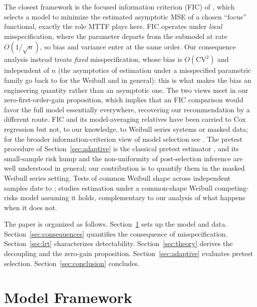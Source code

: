 \documentclass[11pt]{article}
\newcommand{\CV}{\mathrm{CV}}
\begin{document}
The closest framework is the focused information criterion (FIC) of \citet{claeskens2003fic, hjort2003fma}, which selects a model to minimize the estimated asymptotic MSE of a chosen ``focus'' functional, exactly the role MTTF plays here. FIC operates under \emph{local} misspecification, where the parameter departs from the submodel at rate $O(1/\sqrt{n})$, so bias and variance enter at the same order. Our consequence analysis instead treats \emph{fixed} misspecification, whose bias is $O(\CV^2)$ and independent of $n$ (the asymptotics of estimation under a misspecified parametric family go back to \citet{pascual2005} for the Weibull and \citet{White-1982} in general); this is what makes the bias an engineering quantity rather than an asymptotic one. The two views meet in our zero-first-order-gain proposition, which implies that an FIC comparison would favor the full model essentially everywhere, recovering our recommendation by a different route. FIC and its model-averaging relatives \citep{claeskens2008book} have been carried to Cox regression \citep{claeskens2006cox} but not, to our knowledge, to Weibull series systems or masked data; for the broader information-criterion view of model selection see \citet{burnham2002}. The pretest procedure of Section~\ref{sec:adaptive} is the classical pretest estimator \citep{bancroft1944, judge1978, giles1993, danilov2004}, and its small-sample risk hump and the non-uniformity of post-selection inference \citep{leeb2005} are well understood in general; our contribution is to quantify them in the masked Weibull series setting. Tests of common Weibull shape across independent samples date to \citet{mccool1975, mccool1979}; \citet{hart2024} studies estimation under a common-shape Weibull competing-risks model assuming it holds, complementary to our analysis of what happens when it does not.

The paper is organized as follows. Section~\ref{sec:framework} sets up the model and data. Section~\ref{sec:consequences} quantifies the consequence of misspecification. Section~\ref{sec:lrt} characterizes detectability. Section~\ref{sec:theory} derives the decoupling and the zero-gain proposition. Section~\ref{sec:adaptive} evaluates pretest selection. Section~\ref{sec:conclusion} concludes.

\section{Model Framework}
\label{sec:framework}
\end{document}
